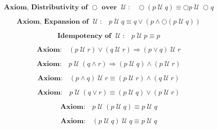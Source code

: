 \documentclass[fleqn, leqno]{article}
\newcommand{\until}{\;\mathcal{U}\;}
\newcommand{\next}{\bigcirc}
\newcommand{\spacer}{\vspace{-30pt}}
\begin{document}
\begin{equation}\label{E:distNextUntil}
\textbf{Axiom, Distributivity of $\next$ over $\until$:}\quad \next (p \until q) \equiv \next p \until \next q
\end{equation}

\spacer

\begin{equation}\label{E:expansionUntil}
\textbf{Axiom, Expansion of $\until$:}\quad p \until q \equiv q \lor (p \land \next (p \until q))
\end{equation}

\spacer

\begin{equation}\label{E:idemUntil}
\textbf{Idempotency of $\until$:}\quad p \until p \equiv p
\end{equation}

\spacer

\begin{equation}\label{E:untilOrImp}
\textbf{Axiom:}\quad (p \until r) \lor (q \until r) \Rightarrow (p \lor q) \until r
\end{equation}

\spacer

\begin{equation}\label{E:untilAndImp}
\textbf{Axiom:}\quad p \until (q \land r) \Rightarrow (p \until q) \land (p \until r)
\end{equation}

\spacer

\begin{equation}\label{E:untilAndEquiv}
\textbf{Axiom:}\quad (p \land q) \until r \equiv (p \until r) \land (q \until r)
\end{equation}

\spacer

\begin{equation}\label{E:untilOrEquiv}
\textbf{Axiom:}\quad p \until (q \lor r) \equiv (p \until q) \lor (p \until r)
\end{equation}

\spacer

\begin{equation}\label{E:untilIdem}
\textbf{Axiom:}\quad p \until (p \until q) \equiv p \until q
\end{equation}

\spacer

\begin{equation}\label{E:untilIdemR}
\textbf{Axiom:}\quad (p \until q) \until q \equiv p \until q
\end{equation}
\end{document}
